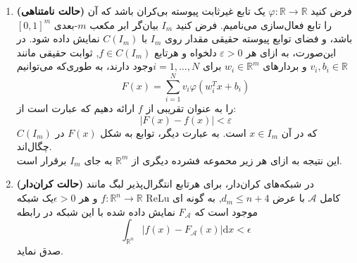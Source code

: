 	\begin{enumerate}
	\item \textbf{(حالت نامتناهی)} فرض کنید $\varphi :\mathbb {R} \to \mathbb {R}$ یک تابع غیرثابت پیوسته بی‌کران باشد که آن را تابع فعال‌سازی می‌نامیم. فرض کنید $I_{m}$ بیان‌گر ابر مکعب $m$-بعدی $[0,1]^{m}$ باشد، و فضای توابع پیوسته حقیقی مقدار روی $I_m$ با $C(I_{m})$ نمایش داده شود. در این‌صورت، به ازای هر $\varepsilon > 0$ دلخواه و هرتابع  $f\in C(I_{m})$, ثوابت حقیقی مانند  $v_{i},b_{i}\in \mathbb  {R}$ و بردارهای $w_{i}\in \mathbb {R} ^{m}$ برای $i=1,\dots ,N$وجود دارند، به طوری‌که می‌توانیم  	
	\begin{equation*}
	F(x)=\sum _{{i=1}}^{{N}}v_{i}\varphi \left(w_{i}^{T}x+b_{i}\right)
	\end{equation*}
	را به عنوان تقریبی از $f$ ارائه دهیم که عبارت است از:
	\begin{equation*}
	|F(x) - f (x)|  < \varepsilon
	\end{equation*}
	که در آن $x\in I_{m}$ است. به عبارت دیگر، توابع به شکل $F(x)$ در $C(I_{m})$ چگال‌اند.\\
	این نتیجه به ازای هر زیر محموعه فشرده دیگری از $\mathbb {R} ^{m}$ به جای  $I_m$ برقرار است.
	\item \textbf{(حالت کران‌دار)} در شبکه‌های کران‌دار، برای هرتابع انتگرال‌پذیر لبگ مانند  $f:\mathbb {R} ^{n}\rightarrow \mathbb {R}$ و هر $\epsilon >0$یک شبکه ReLu کامل $\mathcal {A}$ با عرض $ d_{m}\leq {n+4}$, به گونه ای موجود است که $F_{\mathcal {A}}$ نمایش داده شده با این شبکه در رابطه
	\begin{equation*}
	\int _{\mathbb {R} ^{n}}\left|f(x)-F_{\mathcal {A}}(x)\right|\mathrm {d} x<\epsilon
	\end{equation*}
	صدق ‌نماید.
\end{enumerate}
